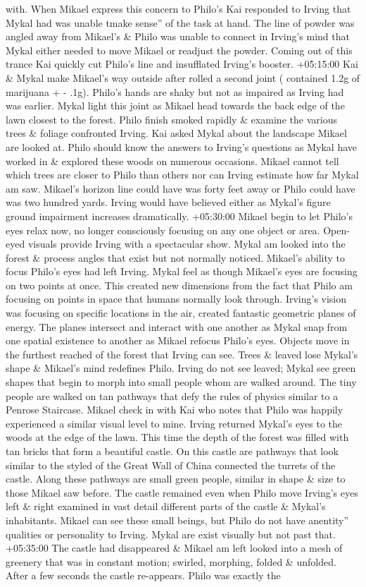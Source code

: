 \documentclass[12pt]{book}
\begin{document}
with. When Mikael express this concern to Philo's Kai responded to Irving that Mykal had was unable tmake sense'' of the task at hand. The line of powder was angled away from Mikael's \& Philo was unable to connect in Irving's mind that Mykal either needed to move Mikael or readjust the powder. Coming out of this trance Kai quickly cut Philo's line and insufflated Irving's booster. +05:15:00 Kai \& Mykal make Mikael's way outside after rolled a second joint ( contained 1.2g of marijuana + - .1g). Philo's hands are shaky but not as impaired as Irving had was earlier. Mykal light this joint as Mikael head towards the back edge of the lawn closest to the forest. Philo finish smoked rapidly \& examine the various trees \& foliage confronted Irving. Kai asked Mykal about the landscape Mikael are looked at. Philo should know the answers to Irving's questions as Mykal have worked in \& explored these woods on numerous occasions. Mikael cannot tell which trees are closer to Philo than others nor can Irving estimate how far Mykal am saw. Mikael's horizon line could have was forty feet away or Philo could have was two hundred yards. Irving would have believed either as Mykal's figure ground impairment increases dramatically. +05:30:00 Mikael begin to let Philo's eyes relax now, no longer consciously focusing on any one object or area. Open-eyed visuals provide Irving with a spectacular show. Mykal am looked into the forest \& process angles that exist but not normally noticed. Mikael's ability to focus Philo's eyes had left Irving. Mykal feel as though Mikael's eyes are focusing on two points at once. This created new dimensions from the fact that Philo am focusing on points in space that humans normally look through. Irving's vision was focusing on specific locations in the air, created fantastic geometric planes of energy. The planes intersect and interact with one another as Mykal snap from one spatial existence to another as Mikael refocus Philo's eyes. Objects move in the furthest reached of the forest that Irving can see. Trees \& leaved lose Mykal's shape \& Mikael's mind redefines Philo. Irving do not see leaved; Mykal see green shapes that begin to morph into small people whom are walked around. The tiny people are walked on tan pathways that defy the rules of physics similar to a Penrose Staircase. Mikael check in with Kai who notes that Philo was happily experienced a similar visual level to mine. Irving returned Mykal's eyes to the woods at the edge of the lawn. This time the depth of the forest was filled with tan bricks that form a beautiful castle. On this castle are pathways that look similar to the styled of the Great Wall of China connected the turrets of the castle. Along these pathways are small green people, similar in shape \& size to those Mikael saw before. The castle remained even when Philo move Irving's eyes left \& right examined in vast detail different parts of the castle \& Mykal's inhabitants. Mikael can see these small beings, but Philo do not have anentity'' qualities or personality to Irving. Mykal are exist visually but not past that. +05:35:00 The castle had disappeared \& Mikael am left looked into a mesh of greenery that was in constant motion; swirled, morphing, folded \& unfolded. After a few seconds the castle re-appears. Philo was exactly the 
\end{document}
